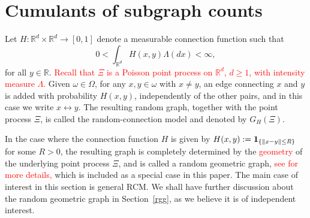 \documentclass[12pt]{article}
\newcommand{\R}{\mathbb{R}}
\newcommand{\bone}{{\bf 1}}
\def\real{{\mathord{\mathbb R}}}
\numberwithin{equation}{section}
\begin{document}
\section{Cumulants of subgraph counts} %
\label{s5}
\noindent
 Let 
 $H:\R^d\times\R^d\to[0,1]$ 
 denote a %
 measurable connection function such that
 \begin{equation}
 \nonumber %
0<\int_{\real^d}H(x,y) \Lambda(dx)< \infty, 
\end{equation}
 for all $y \in\R$. \textcolor{red}{Recall that $\Xi$ is a Poisson point process on $\R^d$, $d \geq 1$, with intensity measure $\Lambda$.}
 Given $\omega \in \Omega$, for any $x,y\in\omega$ with $x\not= y$,
 an edge connecting $x$ and $y$ is added with probability $H(x,y)$,
 independently of the other pairs, and in this case we write $x \leftrightarrow y$.
 The resulting random graph, together with the point process $\Xi$,
 is called the random-connection model and denoted by $G_H(\Xi)$.

 \medskip

 In the case where the connection function $H$ is given by $H(x,y) := \bone_{\{\|x-y\|\leq R\}}$ for some $R>0$, the resulting graph is completely determined by the \textcolor{red}{geometry} of the underlying point process $\Xi$, and is called a random geometric graph, \textcolor{red}{see \cite{penrosebk} for more details,}
 which is included as a special case in this paper. The main case of interest in this section is general RCM. We shall have further discussion about the random geometric graph in Section~\ref{rgg}, as we believe it is of independent interest. 
\end{document}
